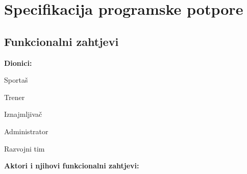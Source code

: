 \chapter{Specifikacija programske potpore}
		
	\section{Funkcionalni zahtjevi}
			

			
			\noindent \textbf{Dionici:}
			
			\begin{packed_enum}
				
				\item Sportaš
				\item Trener
				\item Iznajmljivač
				\item Administrator
				\item Razvojni tim
				
			\end{packed_enum}
			
			\noindent \textbf{Aktori i njihovi funkcionalni zahtjevi:}
			
